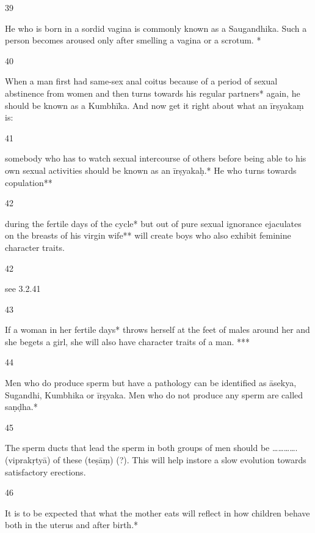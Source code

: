 \begin{translation}
\begin{tt}
\item[39]

 He who is born in a sordid vagina is commonly known as a Saugandhika. 
  Such a person becomes aroused only after smelling a vagina or a scrotum. *
  
\item[40]

 When a man first had same-sex anal coitus because of a period of 
  sexual abstinence from women and then turns towards his regular partners* 
  again, he should be known as a Kumbhīka. And now get it right about what an 
  īrṣyakaṃ is:
  
\item[41]

 somebody who has to watch sexual intercourse of others before being 
  able to his own sexual activities should be known as an  īrṣyakaḥ.* He who 
  turns towards copulation**
  
\item[42]

 during the fertile days of the cycle* but out of pure sexual ignorance 
  ejaculates on the breasts of his virgin wife** will create boys who also exhibit 
  feminine character traits.
  
\item[42]

see 3.2.41
  
\item[43]

 If a woman in her fertile days* throws herself at the feet of males 
  around her and she begets a girl, she will also have character traits of a man. 
  *** 
  
\item[44]

Men who do produce sperm but have a pathology can be identified as 
  āsekya, Sugandhi, Kumbhika or īrṣyaka. Men who do not produce any sperm 
  are called saṇḍha.*
  
\item[45]

The sperm ducts that lead the sperm in both groups of men should be 
  …………. (viprakṛtyā) of these (teṣāṃ) (?). This will help instore a slow evolution 
  towards satisfactory erections. 
  
\item[46]

 It is to be expected that what the mother eats will reflect in how 
  children behave both in the uterus and after birth.*
  

\end{tt}
\end{translation}

